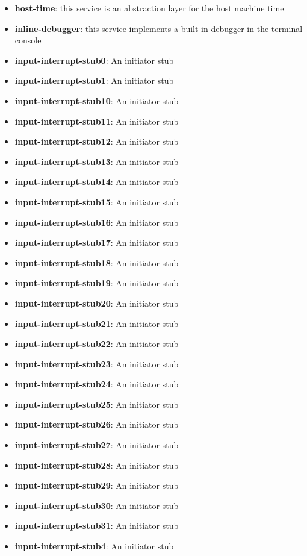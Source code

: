 \begin{itemize}
\item \textbf{host-time}: this service is an abstraction layer for the host machine time
\item \textbf{inline-debugger}: this service implements a built-in debugger in the terminal console
\item \textbf{input-interrupt-stub0}: An initiator stub
\item \textbf{input-interrupt-stub1}: An initiator stub
\item \textbf{input-interrupt-stub10}: An initiator stub
\item \textbf{input-interrupt-stub11}: An initiator stub
\item \textbf{input-interrupt-stub12}: An initiator stub
\item \textbf{input-interrupt-stub13}: An initiator stub
\item \textbf{input-interrupt-stub14}: An initiator stub
\item \textbf{input-interrupt-stub15}: An initiator stub
\item \textbf{input-interrupt-stub16}: An initiator stub
\item \textbf{input-interrupt-stub17}: An initiator stub
\item \textbf{input-interrupt-stub18}: An initiator stub
\item \textbf{input-interrupt-stub19}: An initiator stub
\item \textbf{input-interrupt-stub20}: An initiator stub
\item \textbf{input-interrupt-stub21}: An initiator stub
\item \textbf{input-interrupt-stub22}: An initiator stub
\item \textbf{input-interrupt-stub23}: An initiator stub
\item \textbf{input-interrupt-stub24}: An initiator stub
\item \textbf{input-interrupt-stub25}: An initiator stub
\item \textbf{input-interrupt-stub26}: An initiator stub
\item \textbf{input-interrupt-stub27}: An initiator stub
\item \textbf{input-interrupt-stub28}: An initiator stub
\item \textbf{input-interrupt-stub29}: An initiator stub
\item \textbf{input-interrupt-stub30}: An initiator stub
\item \textbf{input-interrupt-stub31}: An initiator stub
\item \textbf{input-interrupt-stub4}: An initiator stub

\end{itemize}
